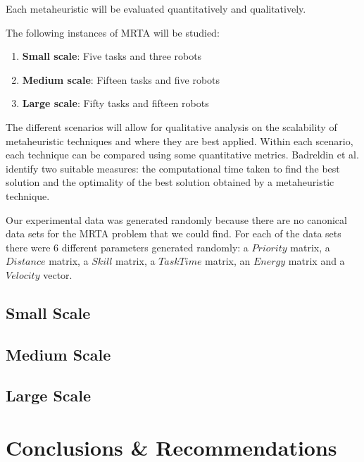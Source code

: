 \documentclass[a4paper]{article}
\begin{document}
Each metaheuristic will be evaluated quantitatively and qualitatively.

The following instances of MRTA will be studied:
\begin{enumerate}
\item \textbf{Small scale}: Five tasks and three robots
\item \textbf{Medium scale}: Fifteen tasks and five robots
\item \textbf{Large scale}: Fifty tasks and fifteen robots
\end{enumerate}

The different scenarios will allow for qualitative analysis on the scalability of metaheuristic techniques and where they are best applied. Within each scenario, each technique can be compared using some quantitative metrics. Badreldin et al. \cite{Badreldin} identify two suitable measures: the computational time taken to find the best solution and the optimality of the best solution obtained by a metaheuristic technique.

Our experimental data was generated randomly because there are no canonical data sets for the MRTA problem that we could find. For each of the data sets there were 6 different parameters generated randomly: a $\mathit{Priority}$ matrix, a $\mathit{Distance}$ matrix, a $\mathit{Skill}$ matrix, a $\mathit{Task Time}$ matrix, an $\mathit{Energy}$ matrix and a $\mathit{Velocity}$ vector.

\subsection{Small Scale}

\subsection{Medium Scale}

\subsection{Large Scale}

\section{Conclusions \& Recommendations}

\end{document}
